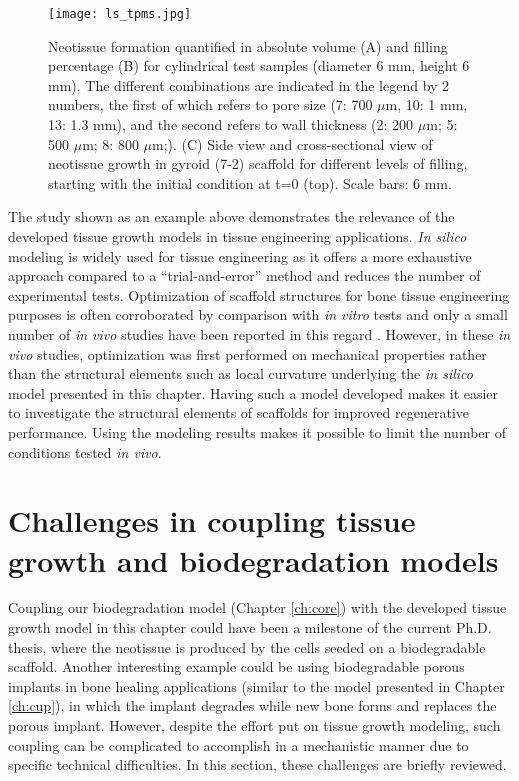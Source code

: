\begin{figure}
\centering
\medskip
\texttt{[image: ls\_tpms.jpg]}
\caption[Simulation results of the level-set model for neotissue formation on TPMS scaffolds]{Neotissue formation quantified in absolute volume (A) and filling percentage (B) for cylindrical test samples (diameter 6 mm, height 6 mm). The different combinations are indicated in the legend by 2 numbers, the first of which refers to pore size (7: 700 $\mu$m, 10: 1 mm, 13: 1.3 mm), and the second refers to wall thickness (2: 200 $\mu$m; 5: 500 $\mu$m; 8: 800 $\mu$m;). (C) Side view and cross-sectional view of neotissue growth in gyroid (7-2) scaffold for different levels of filling, starting with the initial condition at t=0 (top). Scale bars: 6 mm.}
\label{fig:tissue_ls_tpms}
\end{figure}

The study shown as an example above \cite{Hede2021} demonstrates the relevance of the developed tissue growth models in tissue engineering applications. \textit{In silico} modeling is widely used for tissue engineering as it offers a more exhaustive approach compared to a ``trial-and-error'' method and reduces the number of experimental tests. Optimization of scaffold structures for bone tissue engineering purposes is often corroborated by comparison with \textit{in vitro} tests \cite{Alias2017,Rubert2021} and only a small number of \textit{in vivo} studies have been reported in this regard \cite{Long2012,Luo2017,Luo2015}. However, in these \textit{in vivo} studies, optimization was first performed on mechanical properties rather than the structural elements such as local curvature underlying the \textit{in silico} model presented in this chapter. Having such a model developed makes it easier to investigate the structural elements of scaffolds for improved regenerative performance. Using the modeling results makes it possible to limit the number of conditions tested \textit{in vivo}.

\section{Challenges in coupling tissue growth and biodegradation models} \label{sec:tissue_challenges}

Coupling our biodegradation model \cite{Barzegari2021} (Chapter \ref{ch:core}) with the developed tissue growth model in this chapter could have been a milestone of the current Ph.D. thesis, where the neotissue is produced by the cells seeded on a biodegradable scaffold. Another interesting example could be using biodegradable porous implants in bone healing applications (similar to the model presented in Chapter \ref{ch:cup}), in which the implant degrades while new bone forms and replaces the porous implant. However, despite the effort put on tissue growth modeling, such coupling can be complicated to accomplish in a mechanistic manner due to specific technical difficulties. In this section, these challenges are briefly reviewed.

